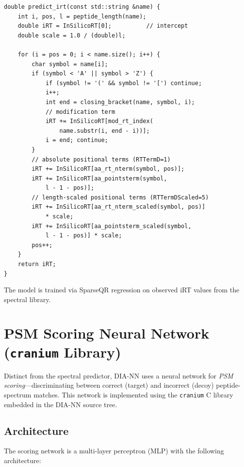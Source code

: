 \documentclass[11pt,a4paper]{article}
\begin{document}
\begin{lstlisting}[caption={Retention time prediction (lines 1726--1749)}]
double predict_irt(const std::string &name) {
    int i, pos, l = peptide_length(name);
    double iRT = InSilicoRT[0];          // intercept
    double scale = 1.0 / (double)l;

    for (i = pos = 0; i < name.size(); i++) {
        char symbol = name[i];
        if (symbol < 'A' || symbol > 'Z') {
            if (symbol != '(' && symbol != '[') continue;
            i++;
            int end = closing_bracket(name, symbol, i);
            // modification term
            iRT += InSilicoRT[mod_rt_index(
                name.substr(i, end - i))];
            i = end; continue;
        }
        // absolute positional terms (RTTermD=1)
        iRT += InSilicoRT[aa_rt_nterm(symbol, pos)];
        iRT += InSilicoRT[aa_pointsterm(symbol,
            l - 1 - pos)];
        // length-scaled positional terms (RTTermDScaled=5)
        iRT += InSilicoRT[aa_rt_nterm_scaled(symbol, pos)]
            * scale;
        iRT += InSilicoRT[aa_pointsterm_scaled(symbol,
            l - 1 - pos)] * scale;
        pos++;
    }
    return iRT;
}
\end{lstlisting}

The model is trained via SparseQR regression on observed iRT values from the spectral library.

\section{PSM Scoring Neural Network (\texttt{cranium} Library)}
\label{sec:cranium}

Distinct from the spectral predictor, DIA-NN uses a neural network for \emph{PSM scoring}---discriminating between correct (target) and incorrect (decoy) peptide-spectrum matches. This network is implemented using the \texttt{cranium} C library embedded in the DIA-NN source tree.

\subsection{Architecture}

The scoring network is a multi-layer perceptron (MLP) with the following architecture:
\end{document}
